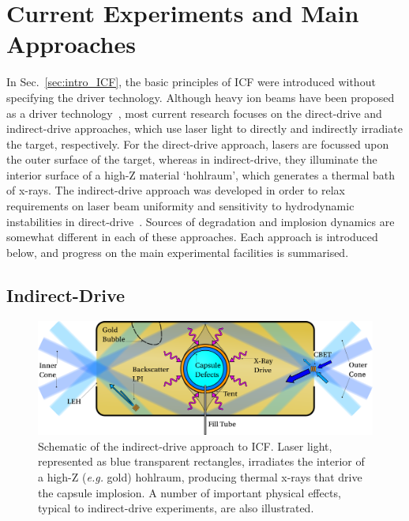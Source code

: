 \section{Current Experiments and Main Approaches}%
\label{sec:intro_mainexperiments}

In Sec.~\ref{sec:intro_ICF}, the basic principles of \ac{ICF} were introduced without specifying the driver technology.
Although heavy ion beams have been proposed as a driver technology~\cite{metzler_target_1984}, most current research focuses on the direct-drive and indirect-drive approaches, which use laser light to directly and indirectly irradiate the target, respectively.
For the direct-drive approach, lasers are focussed upon the outer surface of the target, whereas in indirect-drive, they illuminate the interior surface of a high-Z material `hohlraum', which generates a thermal bath of x-rays.
The indirect-drive approach was developed in order to relax requirements on laser beam uniformity and sensitivity to hydrodynamic instabilities in direct-drive~\cite{lindl_development_1995}.
Sources of degradation and implosion dynamics are somewhat different in each of these approaches.
Each approach is introduced below, and progress on the main experimental facilities is summarised.

\subsection{Indirect-Drive}%
\label{sec:intro_indirect}

\begin{figure}[t!]
    \includegraphics[width=\linewidth]{Introduction/Images/indirect icf white.png}
    \centering
    \caption{Schematic of the indirect-drive approach to \ac{ICF}.
    Laser light, represented as blue transparent rectangles, irradiates the interior of a high-Z (\textit{e.g.} gold) hohlraum, producing thermal x-rays that drive the capsule implosion.
    A number of important physical effects, typical to indirect-drive experiments, are also illustrated.
    }%
    \label{fig:intro_indirect}
\end{figure}

